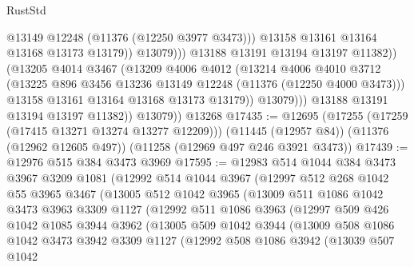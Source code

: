 \begin{lexlean}{RustStd}
\begin{coremodule}
{{{{{{{{{{{{{{{{{{{                                @13149
                                @12248
                                (@11376 (@12250 @3977 @3473)))
                              @13158
                              @13161
                              @13164
                              @13168
                              @13173
                              @13179))
                          @13079)))
                    @13188
                    @13191
                    @13194
                    @13197
                    @11382))
                (@13205
                  @4014
                  @3467
                  (@13209
                    @4006
                    @4012
                    (@13214
                      @4006
                      @4010
                      @3712
                      (@13225 @896 @3456 @13236 @13149 @12248 (@11376 (@12250 @4000 @3473)))
                      @13158
                      @13161
                      @13164
                      @13168
                      @13173
                      @13179))
                  @13079)))
            @13188
            @13191
            @13194
            @13197
            @11382))
        @13079))
    @13268
@17435 := @12695
    (@17255 (@17259 (@17415 @13271 @13274 @13277 @12209)))
    (@11445 (@12957 @84))
    (@11376 (@12962 @12605 @497))
    (@11258 (@12969 @497 @246 @3921 @3473))
@17439 := @12976 @515 @384 @3473 @3969
@17595 := @12983
    @514
    @1044
    @384
    @3473
    @3967
    @3209
    @1081
    (@12992
      @514
      @1044
      @3967
      (@12997
        @512
        @268
        @1042
        @55
        @3965
        @3467
        (@13005
          @512
          @1042
          @3965
          (@13009
            @511
            @1086
            @1042
            @3473
            @3963
            @3309
            @1127
            (@12992
              @511
              @1086
              @3963
              (@12997
                @509
                @426
                @1042
                @1085
                @3944
                @3962
                (@13005
                  @509
                  @1042
                  @3944
                  (@13009
                    @508
                    @1086
                    @1042
                    @3473
                    @3942
                    @3309
                    @1127
                    (@12992
                      @508
                      @1086
                      @3942
                      (@13039
                        @507
                        @1042
}}}}}}}}}}}}}}}}}}}
\end{coremodule}
\end{lexlean}
